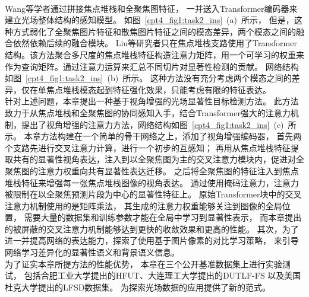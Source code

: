 %
%
\\
\indent
Wang等学者通过拼接焦点堆栈和全聚焦图特征，
一并送入Transformer编码器来建立光场整体结构的感知模型。
如图~\ref{cpt4_fig1:task2_ins}~(a)~所示，
但是，这种方式弱化了全聚焦图片特征和散焦图片特征之间的模态差异，两个模态之间的融合依然依赖后续的融合模块。
Liu等研究者只在焦点堆栈支路使用了Transformer结构。该方法聚合多尺度的焦点堆栈特征构造注意力矩阵，用一个可学习的权重来作为查询矩阵。通过注意力运算来汇总不同切片对显著性检测的贡献。
网络结构如图~\ref{cpt4_fig1:task2_ins}~(b)~所示。
这种方法没有充分考虑两个模态之间的差异，仅在单焦点堆栈模态起到特征强化效果，只能考虑有限的特征表达。\\
%
%
%
%
\indent
针对上述问题，本章提出一种基于视角增强的光场显著性目标检测方法。
此方法致力于从焦点堆栈和全聚焦图的协同感知入手，结合Transformer强大的注意力机制，提出了视角增强的注意力方法，网络结构如图~\ref{cpt4_fig1:task2_ins}~(c)~所示。
本章方法构建在一个简单的骨干网络之上，添加了视角增强编码器，
首先两个支路先进行交叉注意力计算，进行一个初步的互感知；
再用从焦点堆栈特征提取共有的显著性视角表达，注入到以全聚焦图为主的交叉注意力模块内，促进对全聚焦图的注意力权重向共有显著性表达迁移。
之后将全聚焦图的特征注入到焦点堆栈特征来增强每一张焦点堆栈图像的视角表达。
通过使用掩码注意力，注意力被限制在以全聚焦预测片段为中心的显著性特征上。
原始Transformer块中的交叉注意力机制使用的是矩阵乘法，
其生成的注意力权重能够关注到图像的全局位置，
需要大量的数据集和训练参数才能在全局中学习到显著性表示，
而本章提出的被屏蔽的交叉注意力机制能够达到更快的收敛效果和更高的性能。
其次，为了进一并提高网络的表达能力，探索了使用基于图片像素的对比学习策略，
来引导网络学习差异化的显著性语义和背景语义信息。
\\
\indent 
为了证实本章所提方法的性能优势，
本章在三个公开基准数据集上进行实验测试，
包括合肥工业大学提出的HFUT、大连理工大学提出的DUTLF-FS
以及美国杜克大学提出的LFSD数据集。
为探索光场数据的应用提供了新的范式。
% 
% 
% 
% 
